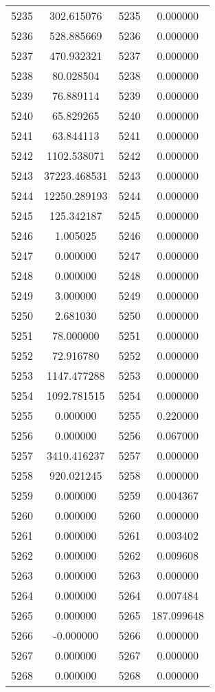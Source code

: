 \documentclass[12pt]{article}
\begin{document}
\begin{longtable}{@{}cccc@{}}
5235 & 302.615076 & 5235 & 0.000000 \\
5236 & 528.885669 & 5236 & 0.000000 \\
5237 & 470.932321 & 5237 & 0.000000 \\
5238 & 80.028504 & 5238 & 0.000000 \\
5239 & 76.889114 & 5239 & 0.000000 \\
5240 & 65.829265 & 5240 & 0.000000 \\
5241 & 63.844113 & 5241 & 0.000000 \\
5242 & 1102.538071 & 5242 & 0.000000 \\
5243 & 37223.468531 & 5243 & 0.000000 \\
5244 & 12250.289193 & 5244 & 0.000000 \\
5245 & 125.342187 & 5245 & 0.000000 \\
5246 & 1.005025 & 5246 & 0.000000 \\
5247 & 0.000000 & 5247 & 0.000000 \\
5248 & 0.000000 & 5248 & 0.000000 \\
5249 & 3.000000 & 5249 & 0.000000 \\
5250 & 2.681030 & 5250 & 0.000000 \\
5251 & 78.000000 & 5251 & 0.000000 \\
5252 & 72.916780 & 5252 & 0.000000 \\
5253 & 1147.477288 & 5253 & 0.000000 \\
5254 & 1092.781515 & 5254 & 0.000000 \\
5255 & 0.000000 & 5255 & 0.220000 \\
5256 & 0.000000 & 5256 & 0.067000 \\
5257 & 3410.416237 & 5257 & 0.000000 \\
5258 & 920.021245 & 5258 & 0.000000 \\
5259 & 0.000000 & 5259 & 0.004367 \\
5260 & 0.000000 & 5260 & 0.000000 \\
5261 & 0.000000 & 5261 & 0.003402 \\
5262 & 0.000000 & 5262 & 0.009608 \\
5263 & 0.000000 & 5263 & 0.000000 \\
5264 & 0.000000 & 5264 & 0.007484 \\
5265 & 0.000000 & 5265 & 187.099648 \\
5266 & -0.000000 & 5266 & 0.000000 \\
5267 & 0.000000 & 5267 & 0.000000 \\
5268 & 0.000000 & 5268 & 0.000000 \\

\end{longtable}
\end{document}
